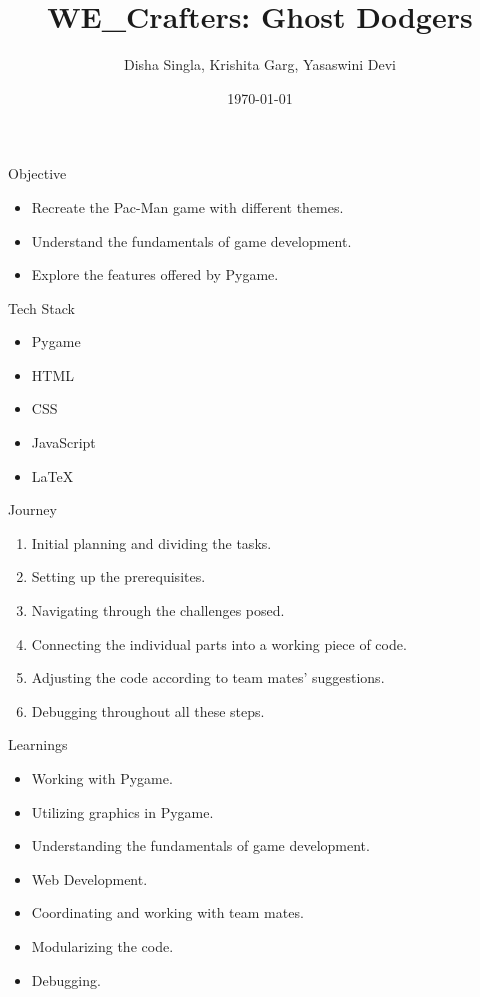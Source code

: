 \documentclass{beamer}
\title{WE\_Crafters: Ghost Dodgers}
\author{Disha Singla, Krishita Garg, Yasaswini Devi}
\date{\today}
\begin{document}
\frame{\titlepage}

\begin{frame}{Objective}
    \begin{itemize}
        \item Recreate the Pac-Man game with different themes.
        \item Understand the fundamentals of game development.
        \item Explore the features offered by Pygame.
    \end{itemize}
\end{frame}

\begin{frame}{Tech Stack}
    \begin{itemize}
        \item Pygame
        \item HTML
        \item CSS
        \item JavaScript
        \item LaTeX
    \end{itemize}
\end{frame}

\begin{frame}{Journey}
    \begin{enumerate}
        \item Initial planning and dividing the tasks.
        \item Setting up the prerequisites.
        \item Navigating through the challenges posed.
        \item Connecting the individual parts into a working piece of code.
        \item Adjusting the code according to team mates' suggestions.
        \item Debugging throughout all these steps.
    \end{enumerate}
\end{frame}

\begin{frame}{Learnings}
    \begin{itemize}
        \item Working with Pygame.
        \item Utilizing graphics in Pygame.
        \item Understanding the fundamentals of game development.
	\item Web Development.
        \item Coordinating and working with team mates.
        \item Modularizing the code.
        \item Debugging.
    \end{itemize}
\end{frame}
\end{document}
